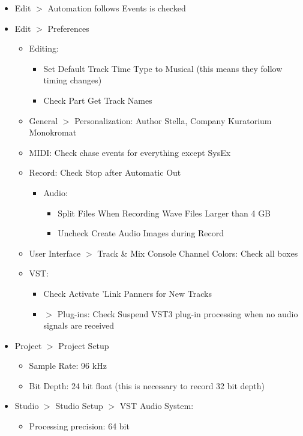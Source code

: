 \documentclass[10pt]{article}
\begin{document}
\begin{itemize}
	\item Edit $>$ Automation follows Events is checked
	\item Edit $>$ Preferences
	\begin{itemize}
		\item Editing:
		\begin{itemize}
			\item Set Default Track Time Type to Musical (this means they follow timing changes)
			\item Check Part Get Track Names
		\end{itemize}
		\item General $>$ Personalization: Author Stella, Company Kuratorium Monokromat
		\item MIDI: Check chase events for everything except SysEx
		\item Record: Check Stop after Automatic  Out
		\begin{itemize}
			\item Audio:
			\begin{itemize}
				\item Split Files When Recording Wave Files Larger than 4 GB
				\item Uncheck Create Audio Images during Record
			\end{itemize}
		\end{itemize}
		\item User Interface $>$ Track \& Mix Console Channel Colors: Check all boxes
		\item VST:
		\begin{itemize}
			\item Check Activate 'Link Panners for New Tracks
			\item $>$ Plug-ins: Check Suspend VST3 plug-in processing when no audio signals are received
		\end{itemize}
	\end{itemize}
	\item Project $>$ Project Setup
	\begin{itemize}
		\item Sample Rate: 96 kHz
		\item Bit Depth: 24 bit float (this is necessary to record 32 bit depth)
	\end{itemize}
	\item Studio $>$ Studio Setup $>$ VST Audio System:
	\begin{itemize}
		\item Processing precision: 64 bit

\end{itemize}
\end{itemize}
\end{document}
